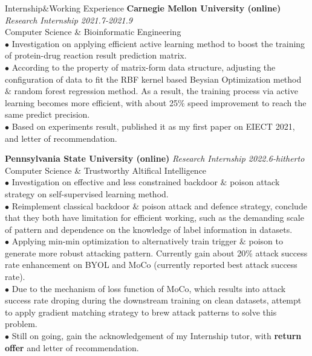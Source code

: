 \documentclass{resume} %
\begin{document}
\begin{rSection}{Internship$\&$Working Experience}
    {\bf Carnegie Mellon University (online)} \hfill {\em Research Internship 2021.7-2021.9} \\
    Computer Science \& Bioinformatic Engineering \\
    {$\bullet$ Investigation on applying efficient active learning method to boost the training of protein-drug reaction result prediction matrix. \\
    $\bullet$ According to the property of matrix-form data structure, adjusting the configuration of data to fit the RBF kernel based Beysian Optimization method $\&$ random forest regression method. As a result, the training process via active learning becomes more efficient, with about 25$\%$ speed improvement to reach the same predict precision. \\
    $\bullet$ Based on experiments result, published it as my first paper on EIECT 2021, and letter of recommendation.}

    {\bf Pennsylvania State University (online)} \hfill {\em Research Internship 2022.6-hitherto} \\
    Computer Science \& Trustworthy Altifical Intelligence \\
    {$\bullet$ Investigation on effective and less constrained backdoor $\&$ poison attack strategy on self-supervised learning method. \\
    $\bullet$ Reimplement classical backdoor $\&$ poison attack and defence strategy, conclude that they both have limitation for efficient working, such as the demanding scale of pattern and dependence on the knowledge of label information in datasets.\\
    $\bullet$ Applying min-min optimization to alternatively train trigger $\&$ poison to generate more robust attacking pattern. Currently gain about 20\% attack success rate enhancement on BYOL and MoCo (currently reported best attack success rate).\\
    $\bullet$ Due to the mechanism of loss function of MoCo, which results into attack success rate droping during the downstream training on clean datasets, attempt to apply gradient matching strategy to brew attack patterns to solve this problem.\\
    $\bullet$ Still on going, gain the acknowledgement of my Internship tutor, with \textbf{return offer} and letter of recommendation.}


\end{rSection}
\end{document}
